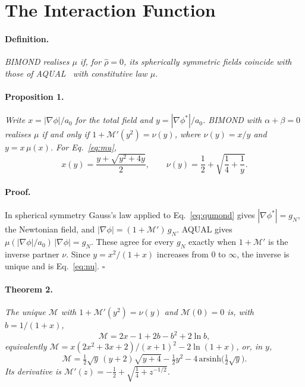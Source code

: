 \documentclass[twocolumn]{iopjournal}
\begin{document}

\section*{The Interaction Function}

\paragraph{Definition.} \textit{BIMOND realises $\mu$ if, for
$\hat\rho = 0$, its spherically symmetric fields coincide with those
of AQUAL~\cite{BekensteinMilgrom1984} with constitutive law $\mu$.}

\paragraph{Proposition 1.} \textit{Write $x = |\nabla\phi|/a_0$ for
the total field and $y = |\nabla\phi^*|/a_0$. BIMOND with
$\alpha + \beta = 0$ realises $\mu$ if and only if
$1 + \mathcal{M}'(y^2) = \nu(y)$, where $\nu(y) = x/y$ and
$y = x\,\mu(x)$. For Eq.~\eqref{eq:mu},}
\begin{equation}
  x(y) = \frac{y + \sqrt{y^2 + 4y}}{2},\qquad
  \nu(y) = \frac12 + \sqrt{\frac14 + \frac1y}.
  \label{eq:nu}
\end{equation}

\paragraph{Proof.} In spherical symmetry Gauss's law applied to
Eq.~\eqref{eq:qumond} gives $|\nabla\phi^*| = g_N$, the Newtonian
field, and $|\nabla\phi| = (1 + \mathcal{M}')\,g_N$. AQUAL gives
$\mu(|\nabla\phi|/a_0)\,|\nabla\phi| = g_N$. These agree for every
$g_N$ exactly when $1 + \mathcal{M}'$ is the inverse partner $\nu$.
Since $y = x^2/(1+x)$ increases from $0$ to $\infty$, the inverse is
unique and is Eq.~\eqref{eq:nu}. \hfill $\square$

\paragraph{Theorem 2.} \textit{The unique $\mathcal{M}$ with
$1 + \mathcal{M}'(y^2) = \nu(y)$ and $\mathcal{M}(0) = 0$ is, with
$b = 1/(1+x)$,}
\begin{equation}
  \boxed{\mathcal{M} = 2x - 1 + 2b - b^2 + 2\ln b ,}
  \label{eq:M}
\end{equation}
\textit{equivalently
$\mathcal{M} = x(2x^2+3x+2)/(x+1)^2 - 2\ln(1+x)$, or, in $y$,}
\begin{equation}
  \mathcal{M} = \tfrac12\sqrt y\,(y+2)\sqrt{y+4} - \tfrac12 y^2
     - 4\,\mathrm{arsinh}\big(\tfrac12\sqrt y\big).
  \label{eq:My}
\end{equation}
\textit{Its derivative is $\mathcal{M}'(z) = -\tfrac12 +
\sqrt{\tfrac14 + z^{-1/2}}$.}
\end{document}
